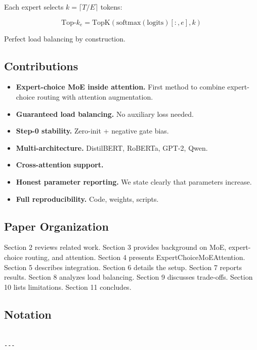 Each expert selects $k = \lceil T / E \rceil$ tokens:

\[
\text{Top-}k_e = \text{TopK}\!\left(\text{softmax}(\text{logits})[:, e], k\right)
\tag{1.6}
\]

Perfect load balancing by construction.

\subsection{Contributions}

\begin{itemize}
\item \textbf{Expert-choice MoE inside attention.} First method to combine expert-
  choice routing with attention augmentation.
\item \textbf{Guaranteed load balancing.} No auxiliary loss needed.
\item \textbf{Step-0 stability.} Zero-init + negative gate bias.
\item \textbf{Multi-architecture.} DistilBERT, RoBERTa, GPT-2, Qwen.
\item \textbf{Cross-attention support.}
\item \textbf{Honest parameter reporting.} We state clearly that parameters increase.
\item \textbf{Full reproducibility.} Code, weights, scripts.

\end{itemize}
\subsection{Paper Organization}

Section 2 reviews related work. Section 3 provides background on MoE, 
expert-choice routing, and attention. Section 4 presents 
ExpertChoiceMoEAttention. Section 5 describes integration. Section 6 details 
the setup. Section 7 reports results. Section 8 analyzes load balancing. 
Section 9 discusses trade-offs. Section 10 lists limitations. Section 11 
concludes.



\subsection{Notation}

\begin{lstlisting}

---
\end{lstlisting}